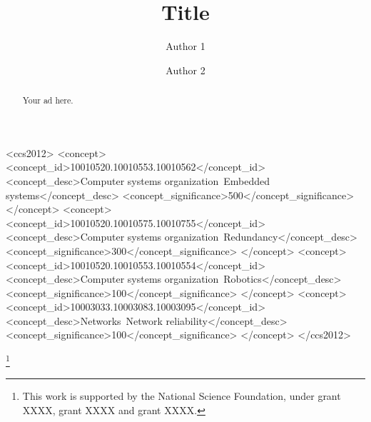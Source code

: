 \documentclass[acmtog, authorversion]{acmart}
\begin{document}
\title{Title} 
\author{Author 1}
\author{Author 2}

\renewcommand\shortauthors{Author1 and Author2}

\begin{abstract}
   Your ad here.
\end{abstract}


%
%
\begin{CCSXML}
<ccs2012>
 <concept>
  <concept_id>10010520.10010553.10010562</concept_id>
  <concept_desc>Computer systems organization~Embedded systems</concept_desc>
  <concept_significance>500</concept_significance>
 </concept>
 <concept>
  <concept_id>10010520.10010575.10010755</concept_id>
  <concept_desc>Computer systems organization~Redundancy</concept_desc>
  <concept_significance>300</concept_significance>
 </concept>
 <concept>
  <concept_id>10010520.10010553.10010554</concept_id>
  <concept_desc>Computer systems organization~Robotics</concept_desc>
  <concept_significance>100</concept_significance>
 </concept>
 <concept>
  <concept_id>10003033.10003083.10003095</concept_id>
  <concept_desc>Networks~Network reliability</concept_desc>
  <concept_significance>100</concept_significance>
 </concept>
</ccs2012>  
\end{CCSXML}


%
%




\thanks{This work is supported by the National Science Foundation, under grant XXXX, grant XXXX and grant XXXX.}

\end{document}
